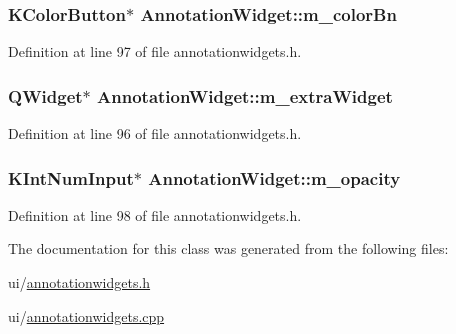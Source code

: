 \hypertarget{classAnnotationWidget_a39083eda5b61826f4b48a787361b9dfc}{
\subsubsection[{m\+\_\+color\+Bn}]{\setlength{\rightskip}{0pt plus 5cm}K\+Color\+Button$\ast$ Annotation\+Widget\+::m\+\_\+color\+Bn\hspace{0.3cm}{\ttfamily [protected]}}}\label{classAnnotationWidget_a39083eda5b61826f4b48a787361b9dfc}


Definition at line 97 of file annotationwidgets.\+h.

\hypertarget{classAnnotationWidget_abd0a469cc5f14e5e73243f405b5d3649}{
\subsubsection[{m\+\_\+extra\+Widget}]{\setlength{\rightskip}{0pt plus 5cm}Q\+Widget$\ast$ Annotation\+Widget\+::m\+\_\+extra\+Widget\hspace{0.3cm}{\ttfamily [protected]}}}\label{classAnnotationWidget_abd0a469cc5f14e5e73243f405b5d3649}


Definition at line 96 of file annotationwidgets.\+h.

\hypertarget{classAnnotationWidget_a234fb5913752d6e4462084b217f3ff6c}{
\subsubsection[{m\+\_\+opacity}]{\setlength{\rightskip}{0pt plus 5cm}K\+Int\+Num\+Input$\ast$ Annotation\+Widget\+::m\+\_\+opacity\hspace{0.3cm}{\ttfamily [protected]}}}\label{classAnnotationWidget_a234fb5913752d6e4462084b217f3ff6c}


Definition at line 98 of file annotationwidgets.\+h.



The documentation for this class was generated from the following files\+:\begin{DoxyCompactItemize}
\item 
ui/\hyperlink{annotationwidgets_8h}{annotationwidgets.\+h}\item 
ui/\hyperlink{annotationwidgets_8cpp}{annotationwidgets.\+cpp}\end{DoxyCompactItemize}

